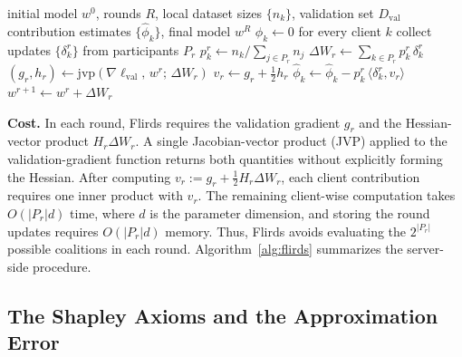\documentclass[letterpaper]{article} %
\theoremstyle{definition} %
\newcommand{\lval}{\ell_{\mathrm{val}}} %
\newcommand{\djh}[1]{{\leavevmode\color{magenta}[DJ: #1]}}
\begin{document}
\begin{algorithm}[H]
\caption{Flirds (server side)}
\label{alg:flirds}
\begin{algorithmic}[1]
\REQUIRE initial model $w^0$, rounds $R$, local dataset sizes $\{n_k\}$,
validation set $D_{\mathrm{val}}$
\ENSURE contribution estimates $\{\hat\phi_k\}$, final model $w^R$
\STATE $\hat\phi_k \gets 0$ for every client $k$
\STATE collect updates $\{\delta_k^r\}$ from participants $P_r$
\STATE $p_k^r \gets n_k / \sum_{j \in P_r} n_j$
\STATE $\Delta W_r \gets \sum_{k \in P_r} p_k^r\, \delta_k^r$
\STATE $(g_r, h_r) \gets \mathrm{jvp}(\nabla \lval,\, w^r;\, \Delta W_r)$
\STATE $v_r \gets g_r + \tfrac12 h_r$
\STATE $\hat\phi_k \gets \hat\phi_k - p_k^r\, \langle \delta_k^r, v_r \rangle$
\ENDFOR
\STATE $w^{r+1} \gets w^r + \Delta W_r$
\ENDFOR
\end{algorithmic}
\end{algorithm}

\noindent\textbf{Cost.} In each round, Flirds requires the validation gradient \(g_r\) and the Hessian-vector product \(H_r\Delta W_r\). A single Jacobian-vector product (JVP) applied to the validation-gradient function returns both quantities without explicitly forming the Hessian. After computing \(v_r := g_r + \tfrac12 H_r\Delta W_r\), each client contribution requires one inner product with \(v_r\). The remaining client-wise computation takes \(O(|P_r|d)\) time, where \(d\) is the parameter dimension, and storing the round updates requires \(O(|P_r|d)\) memory. Thus, Flirds avoids evaluating the \(2^{|P_r|}\) possible coalitions in each round. Algorithm~\ref{alg:flirds} summarizes the server-side procedure.




\subsection{The Shapley Axioms and the Approximation Error}
\label{sec:theory}
\end{document}
